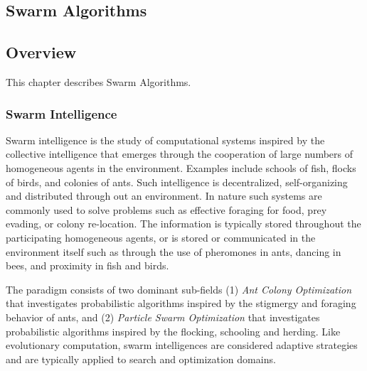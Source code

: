 

\renewcommand{\bibsection}{\subsection{\bibname}}
\begin{bibunit}

\chapter{Swarm Algorithms}
\label{ch:swarm}

\section{Overview}
This chapter describes Swarm Algorithms.


\subsection{Swarm Intelligence}
Swarm intelligence is the study of computational systems inspired by the collective intelligence that emerges through the cooperation of large numbers of homogeneous agents in the environment. Examples include schools of fish, flocks of birds, and colonies of ants. Such intelligence is decentralized, self-organizing and distributed through out an environment. In nature such systems are commonly used to solve problems such as effective foraging for food, prey evading, or colony re-location. The information is typically stored throughout the participating homogeneous agents, or is stored or communicated in the environment itself such as through the use of pheromones in ants, dancing in bees, and proximity in fish and birds.

The paradigm consists of two dominant sub-fields (1) \emph{Ant Colony Optimization} that investigates probabilistic algorithms inspired by the stigmergy and foraging behavior of ants, and (2) \emph{Particle Swarm Optimization} that investigates probabilistic algorithms inspired by the flocking, schooling and herding. Like evolutionary computation, swarm intelligences are considered adaptive strategies and are typically applied to search and optimization domains.


\end{bibunit}
